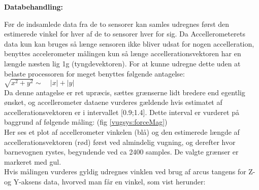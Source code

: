 \textbf{Databehandling:}

Før de indsamlede data fra de to sensorer kan samles udregnes først den estimerede vinkel for hver af de to sensorer hver for sig. Da Accellerometerets data kun kan bruges så længe sensoren ikke bliver udsat for nogen accelleration, benyttes accelerometer målingen kun så længe accellerationsvektoren har en længde næsten lig 1g (tyngdevektoren). For at kunne udregne dette uden at belaste processoren for meget benyttes følgende antagelse:\\
	$\sqrt { { x }^{ 2 }+{ y }^{ 2 } } \sim \quad \left| x \right| +\left| y \right|$ \\
Da denne antagelse er ret upræcis, sættes grænserne lidt bredere end egentlig ønsket, og accellerometer dataene vurderes gældende hvis estimatet af accellerationsvektoren er i intervallet [0.9;1.4]. Dette interval er vurderet på baggrund af følgende måling: (fig \ref{vugsys:forceMag})\\
Her ses et plot af accellerometer vinkelen (blå) og den estimerede længde af accellerationsvektoren (rød) først ved almindelig vugning, og derefter hvor barnevognen rystes, begyndende ved ca 2400 samples. De valgte grænser er markeret med gul.\\
Hvis målingen vurderes gyldig udregnes vinklen ved brug af arcus tangens for Z- og Y-aksens data, hvorved man får en vinkel, som vist herunder:\\
